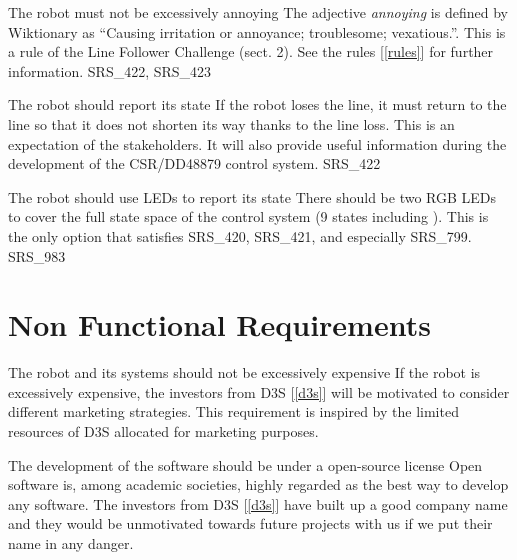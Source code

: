 \begin{itemize}
        {The robot must not be excessively annoying}
        {The adjective {\it annoying} is defined by Wiktionary as ``Causing irritation or annoyance; troublesome; vexatious.''.}
        {This is a rule of the Line Follower Challenge (sect. 2). See the rules [\ref{rules}] for further information.}
        {SRS\_422, SRS\_423}

        {The robot should report its state}
        {If the robot loses the line, it must return to the line so that it does not shorten its way thanks to the line loss.}
        {This is an expectation of the stakeholders. It will also provide useful information during the development of the CSR/DD48879 control system.}
        {SRS\_422}

        {The robot should use LEDs to report its state}
        {There should be two RGB LEDs to cover the full state space of the control system (9 states including ).}
        {This is the only option that satisfies SRS\_420, SRS\_421, and especially SRS\_799.}
        {SRS\_983}

\end{itemize}

\section{Non Functional Requirements}

\begin{itemize}
        {The robot and its systems should not be excessively expensive}
        {If the robot is excessively expensive, the investors from D3S [\ref{d3s}] will be motivated to consider different marketing strategies.}
        {This requirement is inspired by the limited resources of D3S allocated for marketing purposes.}
        {}

        {The development of the software should be under a open-source license}
        {Open software is, among academic societies, highly regarded as the best way to develop any software.}
        {The investors from D3S [\ref{d3s}] have built up a good company name and they would be unmotivated towards future projects with us if we put their name in any danger.}
        {}

\end{itemize}






